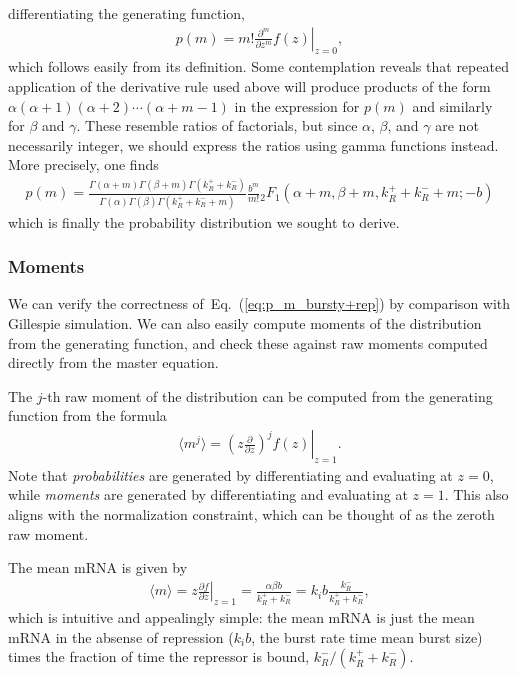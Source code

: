 \documentclass[12pt]{article}%
\newcommand{\pderiv}[2][{}]{\frac{\partial #1}{\partial #2}}
\newcommand{\eq}[1]{Eq.~(\ref{#1})}
\begin{document}
differentiating the generating function,
\begin{align}
p(m) = m! \left.\frac{\partial^m}{\partial z^m} f(z) \right|_{z=0},
\end{align}
which follows easily from its definition. Some contemplation reveals
that repeated application of the derivative rule used above will produce
products of the form $\alpha(\alpha+1)(\alpha+2)\cdots(\alpha+m-1)$ in
the expression for $p(m)$ and similarly for $\beta$ and $\gamma$. These
resemble ratios of factorials, but since $\alpha$, $\beta$, and $\gamma$
are not necessarily integer, we should express the ratios using gamma
functions instead. More precisely, one finds
\begin{align}
p(m) = \frac{
        \Gamma(\alpha + m)\Gamma(\beta + m)\Gamma(k_R^+ + k_R^-)
        }
        {
        \Gamma(\alpha)\Gamma(\beta)\Gamma(k_R^+ + k_R^- + m)
        }
\frac{b^m}{m!}{_2F_1}(\alpha+m, \beta+m, k_R^++k_R^-+m; -b)
\label{eq:p_m_bursty+rep}
\end{align}
which is finally the probability distribution we sought to derive.

\subsubsection{Moments}
We can verify the correctness of~\eq{eq:p_m_bursty+rep}
by comparison with Gillespie simulation.
We can also easily compute moments of the distribution from
the generating function, and check these against raw moments computed
directly from the master equation.

The $j$-th raw moment of the distribution can be computed from the
generating function from the formula
\begin{align}
\langle m^j \rangle
= \left. \left(z \frac{\partial}{\partial z}\right)^j f(z)\right|_{z=1}.
\end{align}
Note that \textit{probabilities} are generated by differentiating
and evaluating at $z=0$, while \textit{moments} are generated by
differentiating and evaluating at $z=1$. This also aligns with the
normalization constraint, which can be thought of as the zeroth raw moment.
        
The mean mRNA is given by
\begin{align}
\langle m \rangle = \left.z \pderiv[f]{z} \right|_{z=1}
= \frac{\alpha\beta b}{k_R^+ + k_R^-}
= k_i b\frac{k_R^-}{k_R^+ + k_R^-},
\end{align}
which is intuitive and appealingly simple:
the mean mRNA is just the mean mRNA in the absense of repression
($k_i b$, the burst rate time mean burst size)
times the fraction of time the repressor is bound, $k_R^-/(k_R^+ + k_R^-)$.
\end{document}
